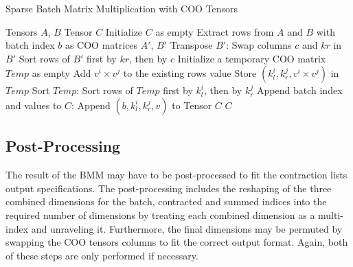 \begin{algorithm}[H]
    \caption{Sparse Batch Matrix Multiplication with COO Tensors}
    \begin{algorithmic}[1]
        \REQUIRE Tensors $A$, $B$
        \ENSURE Tensor $C$
        \STATE Initialize $C$ as empty
            \STATE Extract rows from $A$ and $B$ with batch index $b$ as COO matrices $A'$, $B'$
            \STATE Transpose $B'$:
            \STATE Swap columns $c$ and $kr$ in $B'$
            \STATE Sort rows of $B'$ first by $kr$, then by $c$
            \STATE Initialize a temporary COO matrix $Temp$ as empty
                        \STATE Add $v^i \times v^j$ to the existing rows value
                    \ELSE
                        \STATE Store $(k_l^i, k_r^j, v^i \times v^j)$ in $Temp$
                    \ENDIF
                \ENDFOR
            \ENDFOR
            \STATE Sort $Temp$:
            \STATE Sort rows of $Temp$ first by $k_l^i$, then by $k_r^j$
            \STATE Append batch index and values to $C$:
                \STATE Append $(b, k_l^i, k_r^j, v)$ to Tensor $C$
            \ENDFOR
        \ENDFOR
        \RETURN $C$
    \end{algorithmic}
\end{algorithm}
    
\subsection{Post-Processing}
The result of the BMM may have to be post-processed to fit the contraction lists output
specifications. The post-processing includes the reshaping of the three combined dimensions for
the batch, contracted and summed indices into the required number of dimensions by treating
each combined dimension as a multi-index and unraveling it. Furthermore, the final dimensions
may be permuted by swapping the COO tensors columns to fit the correct output format. Again,
both of these steps are only performed if necessary.


